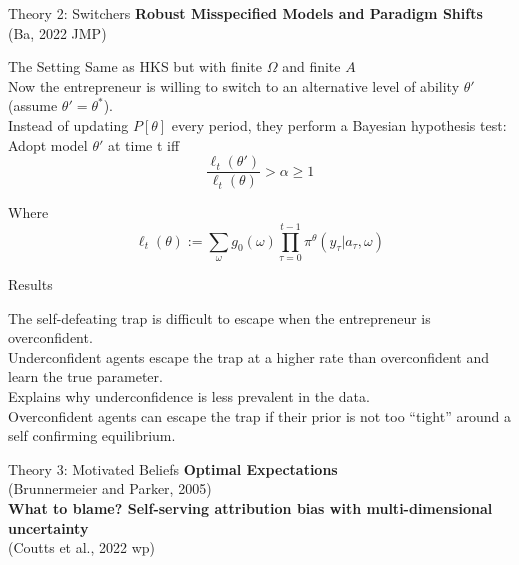 \documentclass[aspectratio=169]{beamer}
\begin{document}
\begin{frame}{Theory 2: Switchers}
    \Large\textbf{ Robust Misspecified Models and Paradigm Shifts \\}
    (Ba, 2022 JMP)
\end{frame}


\begin{frame}{The Setting}
    Same as HKS but with finite $\Omega$ and finite $A$\\
    \bigskip
    Now the entrepreneur is willing to switch to an alternative level of ability $\theta'$ (assume $\theta' = \theta^*$).\\
    \bigskip
    Instead of updating $P[\theta]$ every period, they perform a Bayesian hypothesis test:\\
    \bigskip
    Adopt model $\theta'$ at time t iff \\
    $$\frac{\ell_t (\theta')}{\ell_t(\theta)}>\alpha\geq1$$

    Where $$\ell_t(\theta) := \sum_{\omega}g_0(\omega)\prod_{\tau=0}^{t-1}\pi^\theta(y_\tau|a_\tau, \omega)$$
  
\end{frame}

\begin{frame}{Results}

    The self-defeating trap is difficult to escape when the entrepreneur is overconfident.\\
    \bigskip
    Underconfident agents escape the trap at a higher rate than overconfident and learn the true parameter.\\
    \bigskip
    Explains why underconfidence is less prevalent in the data.\\
    \bigskip
    Overconfident agents can escape the trap if their prior is not too ``tight'' around a self confirming equilibrium.
  
\end{frame}

\begin{frame}{Theory 3: Motivated Beliefs}
    \Large\textbf{Optimal Expectations}\\
    (Brunnermeier and Parker, 2005)\\
    \bigskip
    \Large\textbf{What to blame? Self-serving attribution bias with
multi-dimensional uncertainty}\\
    (Coutts et al., 2022 wp)
\end{frame}
\end{document}
